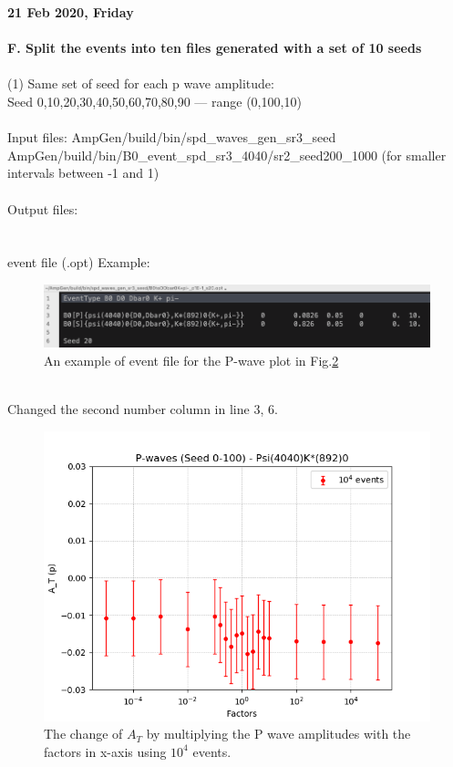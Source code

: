\clearpage
\noindent\textbf{21 Feb 2020, Friday}
\\
\\
\textbf{F. Split the events into ten files generated with a set of 10 seeds}
\\
\\
(1) Same set of seed for each p wave amplitude:
\\
\indent Seed 0,10,20,30,40,50,60,70,80,90 --- range (0,100,10)
\\
\\
\indent Input files: AmpGen/build/bin/spd\_waves\_gen\_sr3\_seed
\\
\indent \indent \indent \indent AmpGen/build/bin/B0\_event\_spd\_sr3\_4040/sr2\_seed200\_1000 (for smaller intervals between -1 and 1)
\\
\\
\indent Output files: 
\\
\indent \indent \indent {}
\\
\\ 
event file (.opt) Example:
\\
\begin{figure}[h]
\center
\includegraphics*[width=0.90\linewidth]{p_wave/event_info_combine_p_10000}
\caption{An example of event file for the P-wave plot in Fig.\ref{spd_waves_combine}}
\label{event_info_combine_p_10000}
\end{figure}
\\
Changed the second number column in line 3, 6.
\begin{figure}[h]
\center
\includegraphics*[width=0.80\linewidth]{p_wave/spd_waves_combine}
\caption{The change of $A_T$ by multiplying the P wave amplitudes with the factors in x-axis using $10^4$ events. }
\label{spd_waves_combine}
\end{figure}

